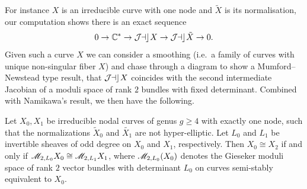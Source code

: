 For instance \(X\) is an irreducible curve with one node and \(\tilde X\) is its
normalisation, our computation shows there is an exact sequence
\[
    0\to \mathbb{C}^\ast\to \mathop{\mathcal{J\kern -0.5pt a\kern -0.5pt c\kern -1pt}} X \to \mathop{\mathcal{J\kern -0.5pt a\kern -0.5pt c\kern -1pt}} \tilde X\to 0.
\]
Given such a curve \(X\) we can consider a smoothing (i.e.\ a family of curves
with unique non-singular fiber \(X\)) and chase through a diagram to show a
Mumford--Newstead type result, that \(\mathop{\mathcal{J\kern -0.5pt a\kern -0.5pt c\kern -1pt}} X\) coincides with the second
intermediate Jacobian of a moduli space of rank \(2\) bundles with fixed
determinant. Combined with Namikawa's result, we then have the following.

\begin{theorem}
    Let \(X_0, X_1\) be irreducible nodal curves of genus \(g\geq 4\) with
    exactly one node, such that the normalizations \(\tilde{X}_0\) and
    \(\tilde{X_1}\) are not hyper-elliptic. Let \(L_0\) and \(L_1\) be
    invertible sheaves of odd degree on \(X_0\) and \(X_1\), respectively. Then
    \(X_0\cong X_2\) if and only if \(\mathscr{M}_{2,L_0}X_0\cong
    \mathscr{M}_{2,L_1}X_1\), where  \(\mathscr{M}_{2,L_0}(X_0)\) denotes the Gieseker
    moduli space of rank \(2\) vector bundles with determinant \(L_0\) on
    curves semi-stably equivalent to \(X_0\).
\end{theorem}
